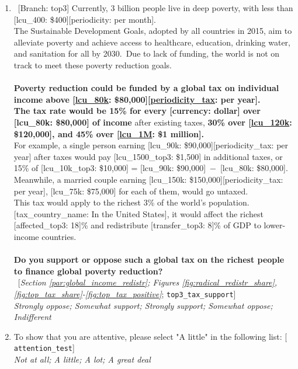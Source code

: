 \documentclass[12pt,english]{article}
\begin{document}
\begin{bibunit}
\begin{enumerate}[resume]
\item ~[Branch: top3] \label{q:top3_tax_support} Currently, 3 billion people live in deep poverty, with less than [lcu\_400: \$400][periodicity: per month].\\The Sustainable Development Goals, adopted by all countries in 2015, aim to alleviate poverty and achieve access to healthcare, education, drinking water, and sanitation for all by 2030.~Due to lack of funding, the world is not on track to meet these poverty reduction goals.\\\\\textbf{Poverty reduction could be funded by a global tax on individual income above [\hyperlink{tab_features}{lcu\_80k}: \$80,000][\hyperlink{tab_features}{periodicity\_tax}: per year].~\\The tax rate would be 15\% for every [currency: dollar] over [lcu\_80k: \$80,000] of income} after existing taxes, \textbf{30\% over [\hyperlink{tab_features}{lcu\_120k}: \$120,000], and 45\% over [\hyperlink{tab_features}{lcu\_1M}: \$1 million].~}\\For example, a single person earning [lcu\_90k: \$90,000][periodicity\_tax: per year] after taxes would pay [lcu\_1500\_top3: \$1,500] in additional taxes, or 15\% of [lcu\_10k\_top3: \$10,000] = [lcu\_90k: \$90,000]~$-$~[lcu\_80k: \$80,000]. Meanwhile, a married couple earning [lcu\_150k: \$150,000][periodicity\_tax: per year], [lcu\_75k: \$75,000] for each of them, would go untaxed.\\This tax would apply to the richest 3\% of the world's population. [tax\_country\_name: In the United States], it would affect the richest [affected\_top3: 18]\% and redistribute [transfer\_top3: 8]\% of GDP to lower-income countries.\\\\\textbf{Do you support or oppose such a global tax on the richest people to finance global poverty reduction?}\\ 
~[\textit{Section \ref{par:global_income_redistr}; Figures \ref{fig:radical_redistr_share}, \ref{fig:top_tax_share}-\ref{fig:top_tax_positive}}; 
\verb|top3_tax_support|]
  \\ \textit{Strongly oppose; Somewhat support; Strongly support; Somewhat oppose; Indifferent}

\item  \label{q:attention_test} To show that you are attentive, please select "A little" in the following list: [%
\verb|attention_test|]
  \\ \textit{Not at all; A little; A lot; A great deal}


\end{enumerate}
\end{bibunit}
\end{document}
